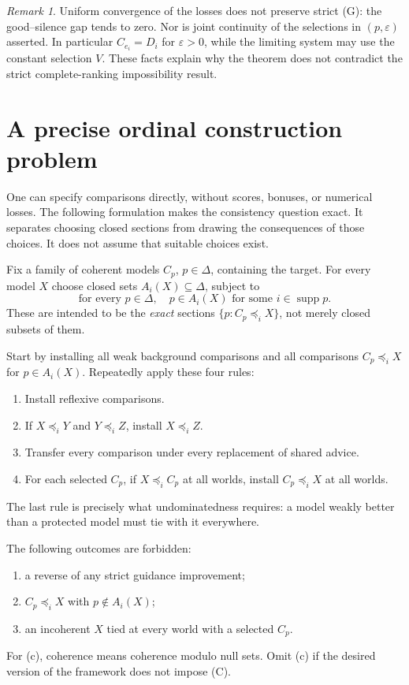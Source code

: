 \documentclass[11pt]{article}
\theoremstyle{remark}\newtheorem{remark}[theorem]{Remark}
\newcommand{\supp}{\operatorname{supp}}
\begin{document}
\begin{remark}
Uniform convergence of the losses does not preserve strict (G): the
good--silence gap tends to zero. Nor is joint continuity of the selections
in $(p,\varepsilon)$ asserted. In particular $C_{e_i}=D_i$ for
$\varepsilon>0$, while the limiting system may use the constant selection
$V$. These facts explain why the theorem does not contradict the strict
complete-ranking impossibility result.
\end{remark}

\section{A precise ordinal construction problem}

One can specify comparisons directly, without scores, bonuses, or numerical
losses. The following formulation makes the consistency question exact.
It separates choosing closed sections from drawing the consequences of
those choices. It does not assume that suitable choices exist.

Fix a family of coherent models $C_p$, $p\in\Delta$, containing the target.
For every model $X$ choose closed sets $A_i(X)\subseteq\Delta$, subject to
\[
 \text{for every }p\in\Delta,\quad
 p\in A_i(X)\text{ for some }i\in\supp p.
\tag{5}
\]
These are intended to be the \emph{exact} sections
$\{p:C_p\preceq_iX\}$, not merely closed subsets of them.

Start by installing all weak background comparisons and all comparisons
$C_p\preceq_iX$ for $p\in A_i(X)$. Repeatedly apply these four rules:
\begin{enumerate}[leftmargin=*,itemsep=3pt]
\item Install reflexive comparisons.
\item If $X\preceq_iY$ and $Y\preceq_iZ$, install $X\preceq_iZ$.
\item Transfer every comparison under every replacement of shared advice.
\item For each selected $C_p$, if $X\preceq_iC_p$ at all worlds, install
      $C_p\preceq_iX$ at all worlds.
\end{enumerate}
The last rule is precisely what undominatedness requires: a model weakly
better than a protected model must tie with it everywhere.

The following outcomes are forbidden:
\begin{enumerate}[label=(\alph*),leftmargin=*,itemsep=3pt]
\item a reverse of any strict guidance improvement;
\item $C_p\preceq_iX$ with $p\notin A_i(X)$;
\item an incoherent $X$ tied at every world with a selected $C_p$.
\end{enumerate}
For (c), coherence means coherence modulo null sets. Omit (c) if the desired
version of the framework does not impose (C).
\end{document}
